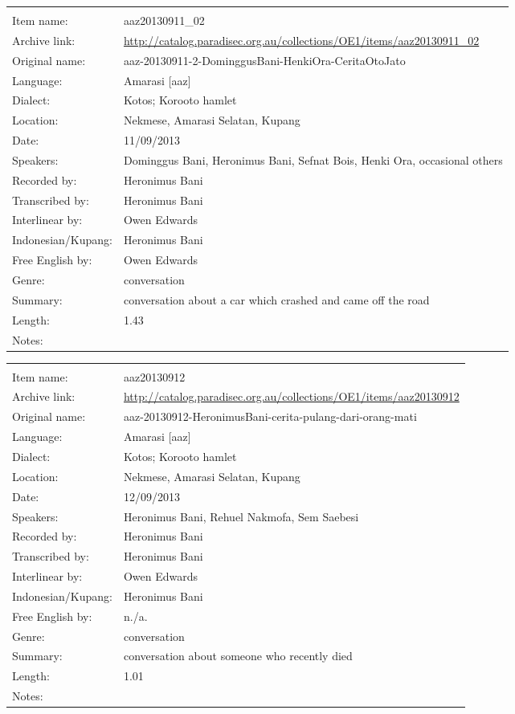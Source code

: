 \newpage
\noindent
\wg\begin{tabular}{lL{.67\textwidth}}
			& \\
Item name:			& aaz20130911{\_}02\\
Archive link:			& \url{http://catalog.paradisec.org.au/collections/OE1/items/aaz20130911_02}\\
Original name:			& {\small aaz-20130911-2-DominggusBani-HenkiOra-CeritaOtoJato}\\
Language:				& Amarasi [aaz] \\
Dialect:				& Kotos; Koro{\Q}oto hamlet \\
Location:				& Nekmese{\Q}, Amarasi Selatan, Kupang \\
Date:				& 11/09/2013\\
Speakers:				& Dominggus Bani, Heronimus Bani, Sefnat Bois, Henki Ora, occasional others\\
Recorded by:			& Heronimus Bani\\
Transcribed by:		& Heronimus Bani\\
Interlinear by:		& Owen Edwards \\
Indonesian/Kupang:		& Heronimus Bani\\
Free English by:		& Owen Edwards\\
Genre:				& conversation\\
Summary:				& conversation about a car which crashed and came off the road\\
Length:				& 1.43\\
Notes:				& \\
\end{tabular}

\newpage
\noindent
\wg\begin{tabular}{lL{.67\textwidth}}
			& \\
Item name:			& aaz20130912\\
Archive link:			& \url{http://catalog.paradisec.org.au/collections/OE1/items/aaz20130912}\\
Original name:			& {\footnotesize aaz-20130912-HeronimusBani-cerita-pulang-dari-orang-mati}\\
Language:				& Amarasi [aaz] \\
Dialect:				& Kotos; Koro{\Q}oto hamlet \\
Location:				& Nekmese{\Q}, Amarasi Selatan, Kupang \\
Date:				& 12/09/2013\\
Speakers:				& Heronimus Bani, Rehuel Nakmofa, Sem Saebesi\\
Recorded by:			& Heronimus Bani\\
Transcribed by:		& Heronimus Bani\\
Interlinear by:		& Owen Edwards \\
Indonesian/Kupang:		& Heronimus Bani\\
Free English by:		& n./a.\\
Genre:				& conversation\\
Summary:				& conversation about someone who recently died\\
Length:				& 1.01\\
Notes:				& \\
\end{tabular}


